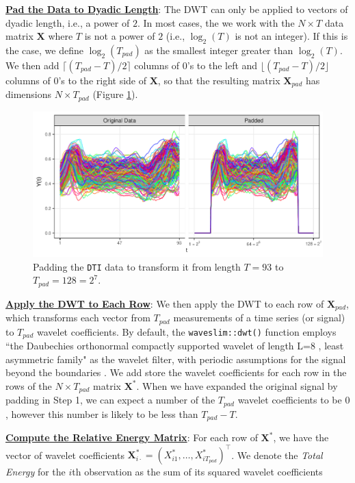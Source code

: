 \begin{steps}
  \item \underline{\textbf{Pad the Data to Dyadic Length}}: The DWT can only be applied to vectors of dyadic length, i.e., a power of $2$. In most cases, the we work with the $N \times T$ data matrix $\mathbf{X}$ where $T$ is not a power of $2$ (i.e., $\log_2(T)$ is not an integer). If this is the case, we define $\log_2(T_{pad})$ as the smallest integer greater than $\log_2(T)$. We then add $\lceil (T_{pad} - T)/2 \rceil$ columns of $0$'s to the left and $\lfloor (T_{pad} - T)/2 \rfloor$ columns of $0$'s to the right side of $\mathbf{X}$, so that the resulting matrix $\mathbf{X}_{pad}$ has dimensions $N \times T_{pad}$ (Figure \ref{fig:DTI-padded}).
  \begin{figure}[H]
      \centering
      \includegraphics[width=0.75\linewidth]{figures/DTI-padded.pdf}
      \caption{Padding the \texttt{DTI} data to transform it from length $T = 93$ to $T_{pad} = 128 = 2^7$.}
      \label{fig:DTI-padded}
  \end{figure}
  \item \underline{\textbf{Apply the DWT to Each Row}}: We then apply the DWT to each row of $\mathbf{X}_{pad}$, which transforms each vector from $T_{pad}$ measurements of a time series (or signal) to $T_{pad}$ wavelet coefficients.
  By default, the \texttt{waveslim::dwt()} function employs ``the Daubechies orthonormal compactly supported wavelet of length L=8 \parencite{daubechies_ten_1992}, least asymmetric family" as the wavelet filter, with periodic assumptions for the signal beyond the boundaries \parencite[][p.7]{whitcher_waveslim_2024}.
  We add store the wavelet coefficients for each row in the rows of the $N \times T_{pad}$ matrix $\mathbf{X}^*$.
  When we have expanded the original signal by padding in Step 1, we can expect a number of the $T_{pad}$ wavelet coefficients to be $0$, however this number is likely to be less than $T_{pad} - T$.
  \item \underline{\textbf{Compute the Relative Energy Matrix}}: For each row of $\mathbf{X}^*$, we have the vector of wavelet coefficients $\mathbf{X}^*_{i\cdot} = (X^*_{i1}, \dots,X^*_{iT_{pad}})^\top$. We denote the \emph{Total Energy} for the $i$th observation as the sum of its squared wavelet coefficients

\end{steps}
